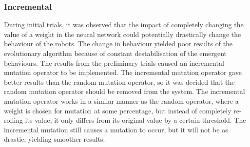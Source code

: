 \subsubsection{Incremental}
During initial trials, it was observed that the impact of completely changing the value of a weight in the neural network could potentially drastically change the behaviour of the robots.
The change in behaviour yielded poor results of the evolutionary algorithm because of constant destabilisation of the emergent behaviours.
The results from the preliminary trials caused an incremental mutation operator to be implemented.
The incremental mutation operator gave better results than the random mutation operator, so it was decided that the random mutation operator should be removed from the system. 
The incremental mutation operator works in a similar manner as the random operator, where a weight is chosen for mutation at some percentage, but instead of completely re-rolling its value, it only differs from its original value by a certain threshold.
The incremental mutation still causes a mutation to occur, but it will not be as drastic, yielding smoother results. 

